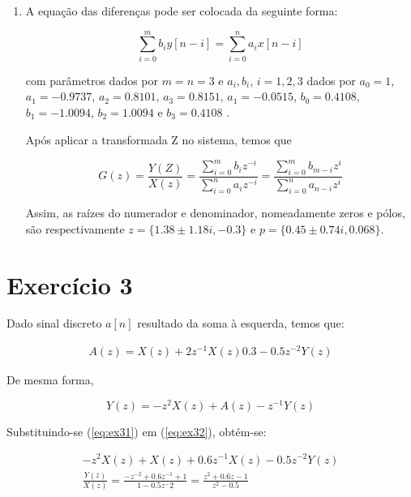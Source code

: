 \documentclass{article}
\begin{document}
\begin{enumerate}
\item %
A equação das diferenças pode ser colocada da seguinte forma:

\begin{equation}
\sum_{i=0}^{m} b_i y[n-i] = \sum_{i=0}^{n} a_i x[n-i]
\end{equation}

com parâmetros dados por $m = n = 3$ e $a_i, b_i$, $i = 1, 2, 3$ dados por $a_0 = 1$, $a_1 = -0.9737$, $a_2 = 0.8101$, $a_3 = 0.8151$, $a_1 = -0.0515$, $b_0 = 0.4108$, $b_1 = -1.0094$, $b_2 = 1.0094$ e $b_3 = 0.4108$ .

Após aplicar a transformada Z no sistema, temos que

\begin{equation}
G(z) = \frac{Y(Z)}{X(z)} = \frac{\sum_{i=0}^{m} b_{i} z^{-i}}{\sum_{i=0}^{n} a_{i} z^{-i}} = \frac{\sum_{i=0}^{m} b_{m-i} z^{i}}{\sum_{i=0}^{n} a_{n-i} z^{i}}
\end{equation}

Assim, as raízes do numerador e denominador, nomeadamente zeros e pólos, são respectivamente $z = \{1.38 \pm 1.18 i, -0.3\}$ e $p = \{0.45 \pm 0.74i, 0.068\}$.

\end{enumerate}

\section*{Exercício 3}
Dado sinal discreto $a[n]$ resultado da soma à esquerda, temos que:

\begin{equation}
\begin{split}
\label{eq:ex31}
A(z) = X(z) + 2 z^{-1} X(z) 0.3 - 0.5 z^{-2} Y(z)
\end{split}
\end{equation}

De mesma forma,

\begin{equation}
\label{eq:ex32}
Y(z) = -z^2 X(z) + A(z) - z^{-1} Y(z)
\end{equation}

Substituindo-se (\ref{eq:ex31}) em (\ref{eq:ex32}), obtém-se:

\begin{equation}
\begin{split}
-z^2 X(z) + X(z) + 0.6  z^{-1} X(z) - 0.5 z^{-2}  Y(z) \\
\frac{Y(z)}{X(z)} = \frac{-z^{-2} + 0.6 z^{-1} + 1}{1 - 0.5 z^-2} = \frac{z^{2} + 0.6 z - 1}{z^2 - 0.5}
\end{split}
\end{equation}
\end{document}
